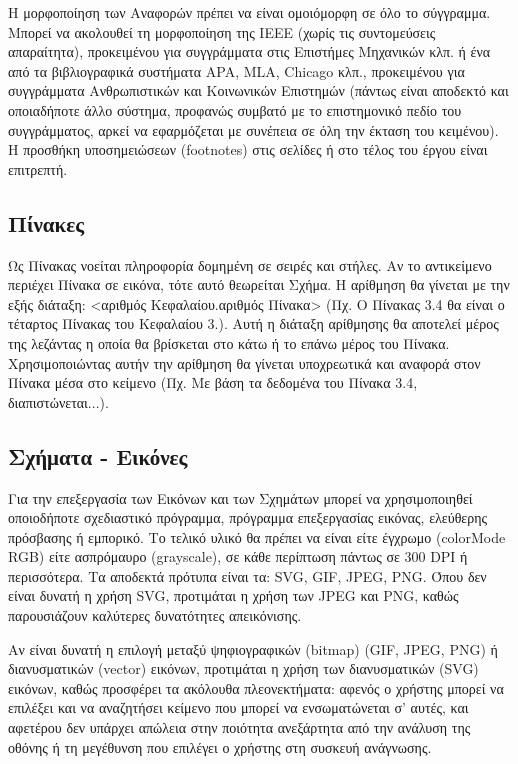 Η μορφοποίηση των Αναφορών πρέπει να είναι ομοιόμορφη σε όλο το σύγγραμμα.
Μπορεί να ακολουθεί τη μορφοποίηση της IEEE (χωρίς τις συντομεύσεις απαραίτητα),
προκειμένου για συγγράμματα στις Επιστήμες Μηχανικών κλπ. ή ένα από τα βιβλιογραφικά
συστήματα APA, MLA, Chicago κλπ., προκειμένου για συγγράμματα Ανθρωπιστικών και
Κοινωνικών Επιστημών (πάντως είναι αποδεκτό και οποιαδήποτε άλλο σύστημα,
προφανώς συμβατό με το επιστημονικό πεδίο του συγγράμματος, αρκεί να
εφαρμόζεται με συνέπεια σε όλη την έκταση του κειμένου).
Η προσθήκη υποσημειώσεων (footnotes) στις σελίδες ή στο τέλος του έργου είναι
επιτρεπτή.

\subsection{Πίνακες}\label{subsec:tables}
Ως Πίνακας νοείται πληροφορία δομημένη σε σειρές και στήλες. Αν το αντικείμενο
περιέχει Πίνακα σε εικόνα, τότε αυτό θεωρείται Σχήμα. Η αρίθμηση θα γίνεται με την
εξής διάταξη: <αριθμός Κεφαλαίου.αριθμός Πίνακα> (Πχ. Ο Πίνακας 3.4 θα είναι ο
τέταρτος Πίνακας του Κεφαλαίου 3.). Αυτή η διάταξη αρίθμησης θα αποτελεί μέρος της
λεζάντας η οποία θα βρίσκεται στο κάτω ή το επάνω μέρος του Πίνακα. Χρησιμοποιώντας
αυτήν την αρίθμηση θα γίνεται υποχρεωτικά και αναφορά στον Πίνακα μέσα στο κείμενο
(Πχ. Με βάση τα δεδομένα του Πίνακα 3.4, διαπιστώνεται...).

\subsection{Σχήματα - Εικόνες}\label{sec:images}

Για την επεξεργασία των Εικόνων και των Σχημάτων μπορεί να χρησιμοποιηθεί
οποιοδήποτε σχεδιαστικό πρόγραμμα, πρόγραμμα επεξεργασίας εικόνας, ελεύθερης
πρόσβασης ή εμπορικό. Το τελικό υλικό θα πρέπει να είναι είτε έγχρωμο (colorMode RGB)
είτε ασπρόμαυρο (grayscale), σε κάθε περίπτωση πάντως σε 300 DPI ή περισσότερα. Τα
αποδεκτά πρότυπα είναι τα: SVG, GIF, JPEG, PNG. Όπου δεν είναι δυνατή η χρήση
SVG, προτιμάται η χρήση των JPEG και PNG, καθώς παρουσιάζουν καλύτερες
δυνατότητες απεικόνισης.

Αν είναι δυνατή η επιλογή μεταξύ ψηφιογραφικών (bitmap) (GIF, JPEG, PNG) ή
διανυσματικών (vector) εικόνων, προτιμάται η χρήση των διανυσματικών (SVG)
εικόνων, καθώς προσφέρει τα ακόλουθα πλεονεκτήματα: αφενός ο χρήστης μπορεί να
επιλέξει και να αναζητήσει κείμενο που μπορεί να ενσωματώνεται σ’ αυτές, και αφετέρου
δεν υπάρχει απώλεια στην ποιότητα ανεξάρτητα από την ανάλυση της οθόνης ή τη
μεγέθυνση που επιλέγει ο χρήστης στη συσκευή ανάγνωσης.

